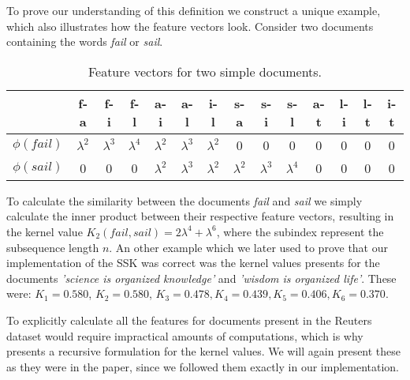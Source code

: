 To prove our understanding of this definition we construct a unique example, which also illustrates how the feature vectors look. Consider two documents containing the words \textit{fail} or \textit{sail}. 

\begin{table}[h]
	\centering
\begin{tabular}{|c|c|c|c|c|c|c|c|c|c|c|c|c|c|}
	\hline 
	& f-a & f-i & f-l & a-i & a-l & i-l & s-a & s-i & s-l & a-t & l-i & l-t & i-t \\ 
	\hline 
	$\phi(fail)$ & $ \lambda^2 $ & $ \lambda^3 $ &$ \lambda^4 $  &  $ \lambda^2 $& $ \lambda^3 $  & $ \lambda^2 $ & 0 & 0 & 0 & 0 & 0 & 0 & 0 \\ 
	\hline 
	$\phi(sail)$ & 0 & 0 & 0 & $\lambda^2$ & $\lambda^3$ & $\lambda^2$ & $\lambda^2$ & $\lambda^3$ & $\lambda^4$ & 0 & 0 & 0 & 0 \\ 
	\hline 
\end{tabular} 
\caption{Feature vectors for two simple documents.}
\end{table}

To calculate the similarity between the documents \textit{fail} and \textit{sail} we simply calculate the inner product between their respective feature vectors, resulting in the kernel value $ K_2(fail,sail)  = 2\lambda^4 + \lambda^6 $, where the subindex represent the subsequence length $ n $. An other example which we later used to prove that our implementation of the SSK was correct was the kernel values \cite{lodhi} presents for the documents \textit{'science is organized knowledge'} and \textit{'wisdom is organized life'}. These were: $ K_1 = 0.580 $, $ K_2 = 0.580$, $ K_3 = 0.478, K_4=0.439, K_5 = 0.406, K_6 = 0.370 $.

To explicitly calculate all the features for documents present in the Reuters dataset would require impractical amounts of computations, which is why \cite{lodhi} presents a recursive formulation for the kernel values. We will again present these as they were in the paper, since we followed them exactly in our implementation. 

